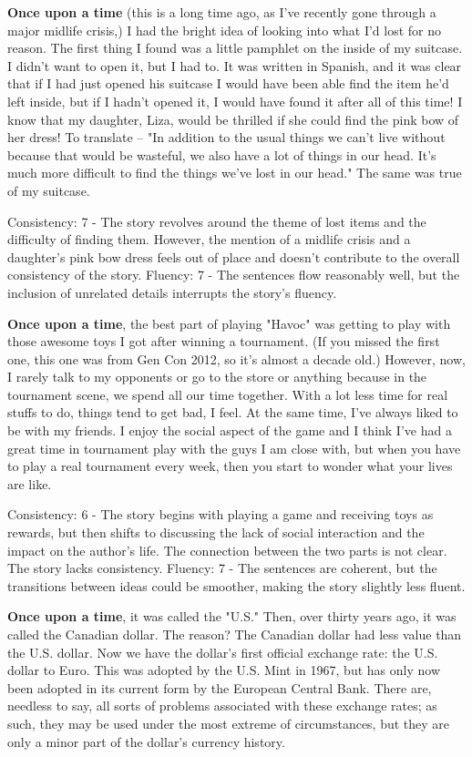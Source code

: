 \documentclass{article}
\begin{document}
\textbf{Once upon a time} (this is a long time ago, as I've recently gone through a major midlife crisis,) I had the bright idea of looking into what I'd lost for no reason. The first thing I found was a little pamphlet on the inside of my suitcase. I didn't want to open it, but I had to. It was written in Spanish, and it was clear that if I had just opened his suitcase I would have been able find the item he'd left inside, but if I hadn't opened it, I would have found it after all of this time! I know that my daughter, Liza, would be thrilled if she could find the pink bow of her dress! To translate – "In addition to the usual things we can't live without because that would be wasteful, we also have a lot of things in our head. It's much more difficult to find the things we've lost in our head." The same was true of my suitcase.

Consistency: 7 - The story revolves around the theme of lost items and the difficulty of finding them. However, the mention of a midlife crisis and a daughter's pink bow dress feels out of place and doesn't contribute to the overall consistency of the story.
Fluency: 7 - The sentences flow reasonably well, but the inclusion of unrelated details interrupts the story's fluency.

\textbf{Once upon a time}, the best part of playing "Havoc" was getting to play with those awesome toys I got after winning a tournament. (If you missed the first one, this one was from Gen Con 2012, so it's almost a decade old.) However, now, I rarely talk to my opponents or go to the store or anything because in the tournament scene, we spend all our time together. With a lot less time for real stuffs to do, things tend to get bad, I feel. At the same time, I've always liked to be with my friends. I enjoy the social aspect of the game and I think I've had a great time in tournament play with the guys I am close with, but when you have to play a real tournament every week, then you start to wonder what your lives are like.

Consistency: 6 - The story begins with playing a game and receiving toys as rewards, but then shifts to discussing the lack of social interaction and the impact on the author's life. The connection between the two parts is not clear. The story lacks consistency.
Fluency: 7 - The sentences are coherent, but the transitions between ideas could be smoother, making the story slightly less fluent.

\textbf{Once upon a time}, it was called the "U.S." Then, over thirty years ago, it was called the Canadian dollar. The reason? The Canadian dollar had less value than the U.S. dollar. Now we have the dollar's first official exchange rate: the U.S. dollar to Euro. This was adopted by the U.S. Mint in 1967, but has only now been adopted in its current form by the European Central Bank. There are, needless to say, all sorts of problems associated with these exchange rates; as such, they may be used under the most extreme of circumstances, but they are only a minor part of the dollar's currency history.
\end{document}
